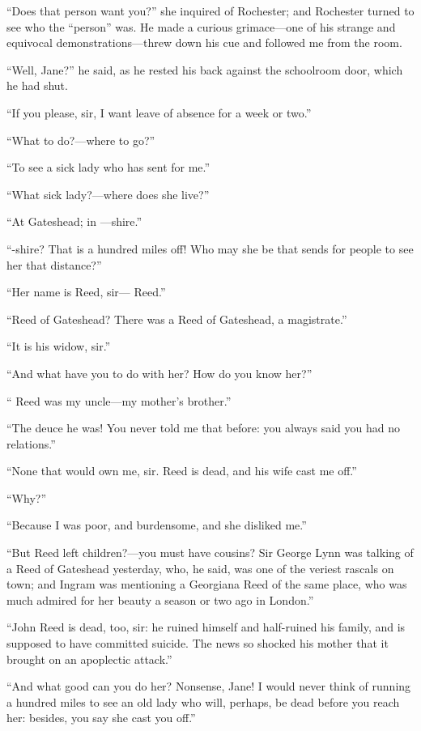\enquote{Does that person want you?} she inquired of \Mr{} Rochester; and
\Mr{} Rochester turned to see who the \enquote{person} was. He made a
curious grimace---one of his strange and equivocal
demonstrations---threw down his cue and followed me from the room.

\enquote{Well, Jane?} he said, as he rested his back against the
schoolroom door, which he had shut.

\enquote{If you please, sir, I want leave of absence for a week or two.}

\enquote{What to do?---where to go?}

\enquote{To see a sick lady who has sent for me.}

\enquote{What sick lady?---where does she live?}

\enquote{At Gateshead; in ---shire.}

\enquote{-shire? That is a hundred miles off! Who may she be that
sends for people to see her that distance?}

\enquote{Her name is Reed, sir---\Mrs{} Reed.}

\enquote{Reed of Gateshead? There was a Reed of Gateshead, a
magistrate.}

\enquote{It is his widow, sir.}

\enquote{And what have you to do with her? How do you know her?}

\enquote{\Mr{} Reed was my uncle---my mother's brother.}

\enquote{The deuce he was! You never told me that before: you always
said you had no relations.}

\enquote{None that would own me, sir. \Mr{} Reed is dead, and his wife
cast me off.}

\enquote{Why?}

\enquote{Because I was poor, and burdensome, and she disliked me.}

\enquote{But Reed left children?---you must have cousins? Sir George
Lynn was talking of a Reed of Gateshead yesterday, who, he said, was one
of the veriest rascals on town; and Ingram was mentioning a Georgiana
Reed of the same place, who was much admired for her beauty a season or
two ago in London.}

\enquote{John Reed is dead, too, sir: he ruined himself and half-ruined
his family, and is supposed to have committed suicide. The news so
shocked his mother that it brought on an apoplectic attack.}

\enquote{And what good can you do her? Nonsense, Jane! I would never
think of running a hundred miles to see an old lady who will, perhaps,
be dead before you reach her: besides, you say she cast you off.}

